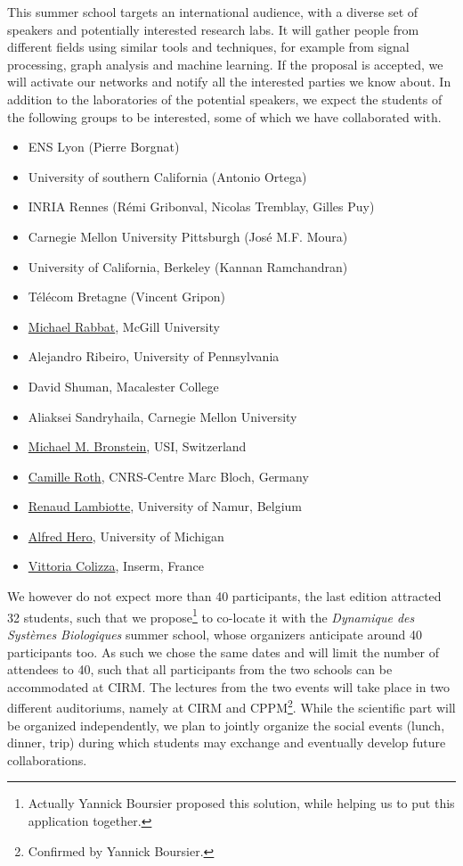 \documentclass[a4paper]{scrartcl}
\begin{document}
This summer school targets an international audience, with a diverse set of
speakers and potentially interested research labs. It will gather people from
different fields using similar tools and techniques, for example from signal
processing, graph analysis and machine learning. If the proposal is accepted, we
will activate our networks and notify all the interested parties we know about.
In addition to the laboratories of the potential speakers, we expect the
students of the following groups to be interested, some of which we have
collaborated with.
\begin{itemize}
	\setlength{\itemsep}{0pt} \setlength{\parskip}{0pt}
	\item ENS Lyon (Pierre Borgnat)
	\item University of southern California (Antonio Ortega) %
	\item INRIA Rennes (Rémi Gribonval, Nicolas Tremblay, Gilles Puy)
	\item Carnegie Mellon University Pittsburgh (José M.F. Moura) %
	\item University of California, Berkeley (Kannan Ramchandran)
	\item Télécom Bretagne (Vincent Gripon)
	\item \href{http://www.ece.mcgill.ca/~mrabba1/}{Michael Rabbat}, McGill
		University %
	\item Alejandro Ribeiro, University of Pennsylvania %
	\item David Shuman, Macalester College
	\item Aliaksei Sandryhaila, Carnegie Mellon University %
	\item \href{http://www.inf.usi.ch/bronstein/}{Michael M. Bronstein}, USI,
		Switzerland
	\item \href{http://camille.roth.free.fr/index.php}{Camille Roth}, CNRS-Centre Marc Bloch, Germany
	\item \href{http://xn.unamur.be/}{Renaud Lambiotte}, University of Namur,
		Belgium
	\item \href{https://web.eecs.umich.edu/~hero/}{Alfred Hero}, University of
		Michigan
	\item \href{http://www.epicx-lab.com/vittoria-colizza.html}{Vittoria
		Colizza}, Inserm, France
\end{itemize}

We however do not expect more than 40 participants, the last edition attracted
32 students, such that we propose\footnote{Actually Yannick Boursier proposed
this solution, while helping us to put this application together.} to co-locate
it with the \textit{Dynamique des Systèmes Biologiques} summer school, whose
organizers anticipate around 40 participants too. As such we chose the same
dates and will limit the number of attendees to 40, such that all participants
from the two schools can be accommodated at CIRM. The lectures from the two
events will take place in two different auditoriums, namely at CIRM and
CPPM\footnote{Confirmed by Yannick Boursier.}. While the scientific part will be
organized independently, we plan to jointly organize the social events (lunch,
dinner, trip) during which students may exchange and eventually develop future
collaborations.
\end{document}
